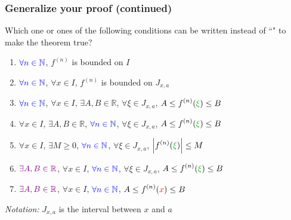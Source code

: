 \documentclass[14pt]{beamer}
\begin{document}
\begin{frame}[t]
	\fontsize{12}{12}\selectfont
	\frametitle{Generalize your proof (continued)}

	Which one or ones of the following conditions can be written instead of ``"
	to make the theorem true?
	\vspace{.2cm}
	\begin{enumerate}
		\item $\displaystyle{\color{blue} \forall n \in \mathbb{N}}$, \;
			$\displaystyle f^{(n)}$ is bounded on $I$
			\vspace{.2cm}

		\item $\displaystyle{\color{blue} \forall n \in \mathbb{N}}$, \;
			{\color{red} $\displaystyle \forall x \in I$}, \; $\displaystyle f^{(n)}$ is
			bounded on $J_{x,a}$
			\vspace{.2cm}

		\item $\displaystyle{\color{blue} \forall n \in \mathbb{N}}$, \;
			{\color{red} $\displaystyle \forall x \in I$}, \; {\color{violet} $\displaystyle \exists A, B \in \mathbb{R}$},
			\; {\color{verde} $\displaystyle \forall \xi \in J_{x,a}$}, \; $\displaystyle
			A \leq f^{(n)}({\color{verde} \xi}) \leq B$
			\vspace{.2cm}

		\item {\color{red} $\displaystyle \forall x \in I$}, \;
			{\color{violet} $\displaystyle \exists A, B \in \mathbb{R}$}, \; $\displaystyle
			{\color{blue} \forall n \in \mathbb{N}}$, \;
			{\color{verde} $\displaystyle \forall \xi \in J_{x,a}$}, \; $\displaystyle
			A \leq f^{(n)}({\color{verde} \xi}) \leq B$
			\vspace{.2cm}

		\item {\color{red} $\displaystyle \forall x \in I$}, \;
			{\color{violet} $\displaystyle \exists M \geq 0$}, \; $\displaystyle{\color{blue} \forall n \in \mathbb{N}}$,
			\; {\color{verde} $\displaystyle \forall \xi \in J_{x,a}$}, \; $\displaystyle
			\left\vert f^{(n)}({\color{verde} \xi}) \right\vert \leq M$
			\vspace{.2cm}

		\item $\displaystyle{\color{violet} \exists A, B \in \mathbb{R}}$, \;
			{\color{red} $\displaystyle \forall x \in I$}, \; $\displaystyle{\color{blue} \forall n \in \mathbb{N}}$,
			\; {\color{verde} $\displaystyle \forall \xi \in J_{x,a}$}, \; $\displaystyle
			A \leq f^{(n)}({\color{verde} \xi}) \leq B$
			\vspace{.2cm}

		\item $\displaystyle{\color{violet} \exists A, B \in \mathbb{R}}$, \;
			{\color{red} $\displaystyle \forall x \in I$}, \; $\displaystyle{\color{blue} \forall n \in \mathbb{N}}$,
			\; $\displaystyle A \leq f^{(n)}({\color{red} x}) \leq B$
	\end{enumerate}
	\vspace{.5cm}

	\emph{Notation:} $\displaystyle J_{x,a}$ is the interval between $x$ and $a$
\end{frame}
\end{document}

